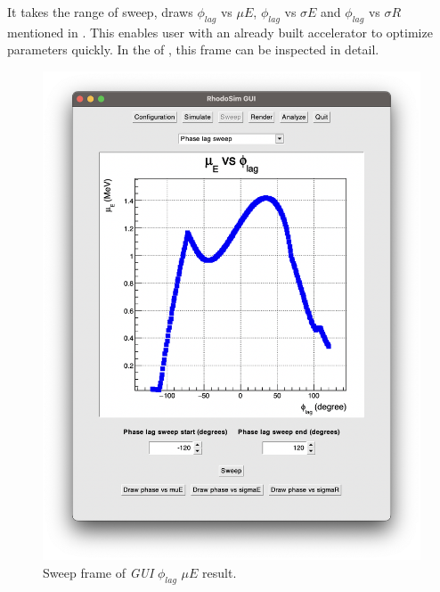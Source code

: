\documentclass{book}
\begin{document}
It takes the range of sweep, draws $\phi_{lag}$ vs $\mu E$, $\phi_{lag}$ vs $\sigma E$ and $\phi_{lag}$ vs $\sigma R$ mentioned in .
This enables user with an already built accelerator to optimize \egun parameters quickly. 
In the  of , this frame can be inspected in detail.
\vspace{10pt}
\begin{figure}[h]
    \centering
    \includegraphics[width=0.85\linewidth]{../../../figures/rhodoSim/GUI_sweep_muE_3.png}
    \caption{Sweep frame of \textit{GUI} $\phi_{lag}$ $\mu E$ result.}
    \label{fig:gui_sweep_muE}
\end{figure}
\clearpage
\end{document}
